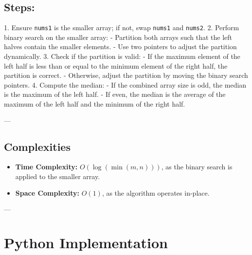 \subsection*{Steps:}
1. Ensure \texttt{nums1} is the smaller array; if not, swap \texttt{nums1} and \texttt{nums2}.
2. Perform binary search on the smaller array:
   - Partition both arrays such that the left halves contain the smaller elements.
   - Use two pointers to adjust the partition dynamically.
3. Check if the partition is valid:
   - If the maximum element of the left half is less than or equal to the minimum element of the right half, the partition is correct.
   - Otherwise, adjust the partition by moving the binary search pointers.
4. Compute the median:
   - If the combined array size is odd, the median is the maximum of the left half.
   - If even, the median is the average of the maximum of the left half and the minimum of the right half.

---

\subsection*{Complexities}
\begin{itemize}
    \item \textbf{Time Complexity:} \(O(\log(\min(m, n)))\), as the binary search is applied to the smaller array.
    \item \textbf{Space Complexity:} \(O(1)\), as the algorithm operates in-place.
\end{itemize}

---

\section*{Python Implementation}

